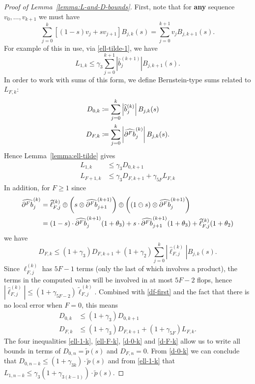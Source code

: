\documentclass[3p, authoryear, square]{elsarticle}
\theoremstyle{definition}
\newcommand{\cdb}[1]{
  \ifthenelse{\equal{#1}{1}}
             {\widehat{\partial b}}
             {\widehat{\partial^{#1} b}}
}
\begin{document}
\begin{proof}[Proof of Lemma~\ref{lemma:L-and-D-bounds}]\label{proof:L-and-D-bounds}
First, note that for \textbf{any} sequence \(v_0, \ldots, v_{k + 1}\) we
must have
\begin{equation}
\sum_{j = 0}^k \left[(1 - s) v_j + s v_{j + 1}\right] B_{j, k}(s) =
\sum_{j = 0}^{k + 1} v_j B_{j, k + 1}(s).
\end{equation}
For example of this in use, via \eqref{ell-tilde-1}, we have
\begin{equation}
  L_{1, k} \leq \gamma_3 \sum_{j = 0}^{k + 1} \left|
  \widehat{b}_j^{(k + 1)}\right| B_{j, k + 1}(s).
\end{equation}
In order to work with sums of this form, we define Bernstein-type
sums related to \(L_{F, k}\):
\begin{align}
D_{0, k} &\coloneqq \sum_{j = 0}^k \left|\widehat{b}_j^{(k)}\right|
B_{j, k}(s) \\
D_{F, k} &\coloneqq \sum_{j = 0}^k \left|\cdb{F}_j^{(k)}\right| B_{j, k}(s).
\end{align}
Hence Lemma~\ref{lemma:ell-tilde} gives
\begin{align}
L_{1, k} &\leq \gamma_3 D_{0, k + 1} \label{ell-1-k} \\
L_{F + 1, k} &\leq \gamma_3 D_{F, k + 1} + \gamma_{5F} L_{F, k}
\label{ell-F-k}
\end{align}
In addition, for \(F \geq 1\) since
\begin{align}
\cdb{F}_j^{(k)} &= \widehat{\ell}_{F, j}^{(k)} \oplus \left(
  s \otimes \cdb{F}_{j + 1}^{(k + 1)}\right) \oplus \left((1 \ominus s) \otimes
  \cdb{F}_{j}^{(k + 1)}\right) \\
&= (1 - s) \cdot \cdb{F}_j^{(k + 1)}(1 + \theta_3) +
  s \cdot \cdb{F}_{j + 1}^{(k + 1)}(1 + \theta_3) +
  \widehat{\ell}_{F, j}^{(k)} (1 + \theta_2)
\end{align}
we have
\begin{equation}\label{df-first}
D_{F, k} \leq (1 + \gamma_3) D_{F, k + 1} + (1 + \gamma_2) \sum_{j = 0}^k
\left|\widehat{\ell}_{F, j}^{(k)}\right| B_{j, k}(s).
\end{equation}
Since \(\ell_{F, j}^{(k)}\) has \(5F - 1\) terms (only the last of which
involves a product), the terms in the computed value will be involved in
at most \(5F - 2\) flops, hence
\(\left|\widehat{\ell}_{F, j}^{(k)}\right| \leq
\left(1 + \gamma_{5F - 2}\right) \widetilde{\ell}_{F, j}^{(k)}.\)
Combined with \eqref{df-first} and the fact that there is no local error
when \(F = 0\), this means
\begin{align}
D_{0, k} &\leq (1 + \gamma_3) D_{0, k + 1} \label{d-0-k} \\
D_{F, k} &\leq (1 + \gamma_3) D_{F, k + 1} + (1 + \gamma_{5F}) L_{F, k}.
\label{d-F-k}
\end{align}
The four inequalities \eqref{ell-1-k}, \eqref{ell-F-k}, \eqref{d-0-k}
and \eqref{d-F-k} allow us to write all bounds in terms of
\(D_{0, n} = \widetilde{p}(s)\) and \(D_{F, n} = 0\). From \eqref{d-0-k}
we can conclude that \(D_{0, n - k} \leq \left(1 + \gamma_{3k}\right) \cdot
\widetilde{p}(s)\) and from \eqref{ell-1-k} that \(L_{1, n - k} \leq
\gamma_3 \left(1 + \gamma_{3(k - 1)}\right) \cdot \widetilde{p}(s)\).


\end{proof}
\end{document}
